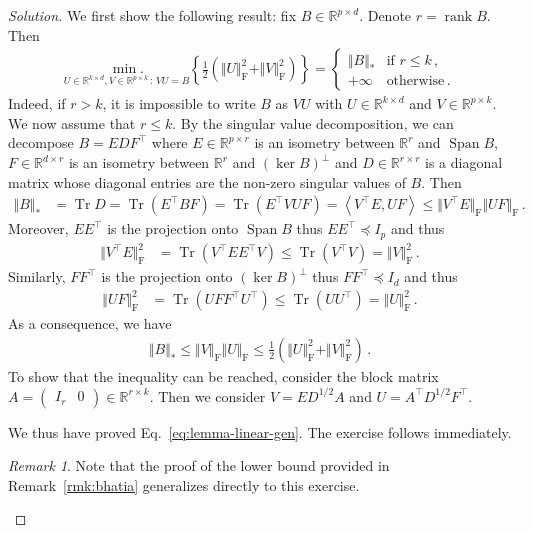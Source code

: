 \documentclass[11pt,reqno]{article}
\DeclareMathOperator{\Tr}{Tr}
\DeclareMathOperator{\Span}{Span}
\DeclareMathOperator{\rank}{rank}
\DeclareMathOperator{\Fro}{F}
\newcommand{\R}{\mathbb{R}}
\renewcommand{\leq}{\leqslant}
\numberwithin{equation}{section}
\theoremstyle{plain}
\theoremstyle{definition}
\theoremstyle{remark}
\newtheorem{remark}[assumption]{Remark}
\begin{document}
\begin{proof}[Solution]
	We first show the following result: fix $B \in \R^{p \times d}$. Denote $r = \rank B$. Then 
	\begin{align}
		\underset{U \in \R^{k \times d},V \in \R^{p \times k} \, : \, VU = B}{\min.} \left\{ \frac{1}{2} \left(\Vert U \Vert_{\Fro}^2 + \Vert V \Vert_{\Fro}^2\right) \right\} = \begin{cases}
			\Vert B \Vert_* &\text{if } r \leq k \, , \\
			+\infty &\text{otherwise} \, .
		\end{cases} 
		\label{eq:lemma-linear-gen}
	\end{align}
	Indeed, if $r>k$, it is impossible to write $B$ as $VU$ with $U \in \R^{k \times d}$ and $V \in \R^{p \times k}$. We now assume that $r \leq k$. By the singular value decomposition, we can decompose $B = EDF^\top$ where $E \in \R^{p\times r}$ is an isometry between $\R^r$ and $\Span B$, $F \in \R^{d \times r}$ is an isometry between $\R^r$ and $(\ker B)^\perp$ and $D \in \R^{r \times r}$ is a diagonal matrix whose diagonal entries are the non-zero singular values of $B$. Then 
\begin{align*}
	\Vert B \Vert_{*} &= \Tr D = \Tr(E^\top B F) =\Tr(E^\top VU F) = \left\langle V^\top E, U F \right\rangle \leq \Vert V^\top E \Vert_{\Fro} \Vert U F \Vert_{\Fro} \, .
\end{align*}
Moreover, $EE^\top$ is the projection onto $\Span B$ thus $EE^\top \preccurlyeq I_p$ and thus 
\begin{align*}
	\Vert V^\top E \Vert_{\Fro}^2 &= \Tr(V^\top E E^\top V) \leq \Tr(V^\top V) = \Vert V \Vert_{\Fro}^2 \, .
\end{align*}
Similarly, $FF^\top$ is the projection onto $(\ker B)^\perp$ thus $FF^\top \preccurlyeq I_d$ and thus
\begin{align*}
	\Vert U F \Vert_{\Fro}^2 &= \Tr(U F F^\top U^\top) \leq \Tr(U U^\top) = \Vert U \Vert_{\Fro}^2 \, .
\end{align*}
As a consequence, we have
\begin{align*}
	\Vert B \Vert_{*} \leq \Vert V \Vert_{\Fro} \Vert U \Vert_{\Fro} \leq \frac{1}{2} \left(\Vert U \Vert_{\Fro}^2 + \Vert V \Vert_{\Fro}^2\right) \, . 
\end{align*}
To show that the inequality can be reached, consider the block matrix $A = \begin{pmatrix}
	I_r & 0
\end{pmatrix} \in \R^{r \times k}$. Then we consider $V = E D^{1/2} A$ and $U = A^\top D^{1/2} F^\top$.

We thus have proved Eq.~\eqref{eq:lemma-linear-gen}. The exercise follows immediately.

\begin{remark}
	Note that the proof of the lower bound provided in Remark~\ref{rmk:bhatia} generalizes directly to this exercise. 
\end{remark}
\end{proof}





\newpage


\end{document}
